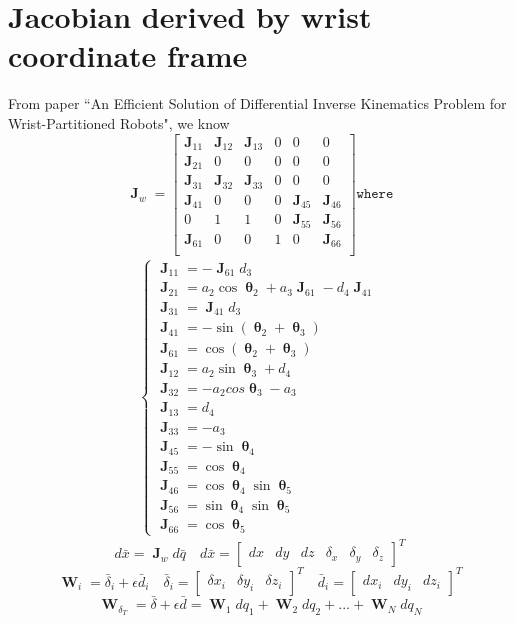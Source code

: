 \documentclass[12pt]{article}
\DeclareMathOperator{\J}{\mathbf{J}}
\DeclareMathOperator{\W}{\mathbf{W}}
\DeclareMathOperator{\Th}{\mathbf{\theta}}
\begin{document}
\section{Jacobian derived by wrist coordinate frame}
From paper ``An Efficient Solution of Differential Inverse Kinematics Problem for Wrist-Partitioned Robots", we know
$$
\J_w = 
\begin{bmatrix}
  \J_{11} & \J_{12} & \J_{13} & 0 & 0 & 0\\
  \J_{21} & 0 & 0 & 0 & 0 & 0\\
  \J_{31} & \J_{32} & \J_{33} & 0 & 0 & 0\\
  \J_{41} & 0 & 0 & 0 & \J_{45} & \J_{46}\\
  0 & 1 & 1 & 0 & \J_{55} & \J_{56}\\
  \J_{61} & 0 & 0 & 1 & 0 & \J_{66}\\
\end{bmatrix} \texttt{where}
$$ 
\begin{align*}
  \begin{cases}
    \J_{11} = -\J_{61}d_3\\
    \J_{21} = a_2\cos\Th_2+a_3\J_{61}-d_4\J_{41}\\
    \J_{31} = \J_{41}d_3\\
    \J_{41} = -\sin(\Th_2+\Th_3)\\
    \J_{61} = \cos(\Th_2+\Th_3)\\
    \J_{12} = a_2\sin\Th_3+d_4\\
    \J_{32} = -a_2cos\Th_3-a_3\\
    \J_{13} = d_4\\
    \J_{33} = -a_3\\
    \J_{45} = -\sin\Th_4\\
    \J_{55} = \cos\Th_4\\
    \J_{46} = \cos\Th_4\sin\Th_5\\
    \J_{56} = \sin\Th_4\sin\Th_5\\
    \J_{66} = \cos\Th_5
  \end{cases}
\end{align*}
$$d\bar{x} = \J_wd\bar{q} \quad d\bar{x} = \begin{bmatrix}dx & dy & dz & \delta_x & \delta_y & \delta_z\end{bmatrix}^T$$
$$\W_i = \bar{\delta}_i + \epsilon \bar{d}_i \quad \bar{\delta}_i = \begin{bmatrix}\delta x_i & \delta y_i & \delta z_i\end{bmatrix}^T \quad \bar{d}_i = \begin{bmatrix}dx_i & dy_i & dz_i\end{bmatrix}^T$$
$$\W_{\delta_T} = \bar{\delta} + \epsilon \bar{d} = \W_1dq_1 + \W_2dq_2 + ... + \W_Ndq_N$$
\end{document}
